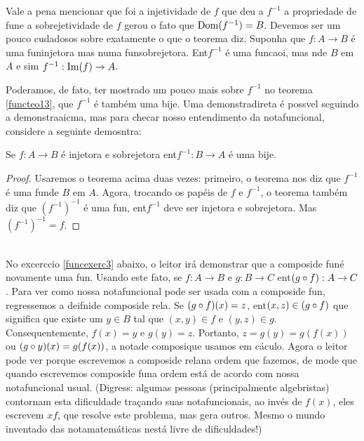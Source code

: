 Vale a pena mencionar que foi a injetividade de $f$ que deu a $f^{-1}$ a propriedade de fun\cao e a sobrejetividade de $f$ gerou o fato que $\operatorname{Dom}(f^{-1})=B$. Devemos ser um pouco cudadosos sobre exatamente o que o teorema diz. Suponha que $f:A\to B$ \'e uma fun\cao injetora mas n\ao uma fun\cao sobrejetora. Ent\ao $f^{-1}$ \'e uma funcaoi, mas n\ao de $B$ em $A$ e sim $f^{-1}:\operatorname{Im}(f)\to A$.

Poder\ih amos, de fato, ter mostrado um pouco mais sobre $f^{-1}$ no teorema \ref{functeo13}, que $f^{-1}$ \'e tamb\'em uma bije\caoi. Uma demonstra\cao direta \'e poss\ih vel seguindo a demonstra\cao aicma, mas para checar nosso entendimento da nota\cao funcional, considere a seguinte demosntra\caoi:
\begin{teob}\label{functeo14}
Se $f:A\to B$ \'e injetora e sobrejetora ent\ao $f^{-1}:B\to A$ \'e uma bije\caoi.
\end{teob}
\begin{proof}
Usaremos o teorema acima duas vezes: primeiro, o teorema nos diz que $f^{-1}$ \'e uma fun\cao de $B$ em $A$. Agora, trocando os pap\'eis de $f$ e $f^{-1}$, o teorema tamb\'em diz que $(f^{-1})^{-1}$ \'e uma fun\caoi, ent\ao $f^{-1}$ deve ser injetora e sobrejetora. Mas $(f^{-1})^{-1}=f$.
\end{proof}
\\

No excerc\ih cio \ref{funcexerc3} abaixo, o leitor ir\'a demonstrar que a composi\cao de fun\coes \'e novamente uma fun\caoi. Usando este fato, se $f:A\to B$ e $g:B\to C$ ent\ao $(g\circ f):A\to C$. Para ver como nossa nota\cao funcional pode ser usada com a composi\cao de fun\cois, regressemos a deifni\cao de composi\cao de rela\cois. Se $(g\circ f)(x)=z$, ent\ao $(x,z)\in (g\circ f)$ que significa que existe um $y\in B$ tal que $(x,y)\in f$ e $(y,z)\in g$. Consequentemente, $f(x)=y$ e $g(y)=z$. Portanto, $z=g(y)=g(f(x))$ ou $(g\circ y)(x)=g(f(x))$, a nota\cao de composi\cao que usamos em c\'aculo. Agora o leitor pode ver porque escrevemos a composi\cao de rela\coes na ordem que fazemos, de mode que quando escrevemos composi\cao de fun\coes a ordem est\'a de acordo com nossa nota\cao funcional usual. (Digress\aoi: algumas pessoas (principalmente algebristas) contornam esta dificuldade traçando suas nota\coes funcionais, ao inv\'es de $f(x)$, eles escrevem $xf$, que resolve este problema, mas gera outros. Mesmo o mundo inventado das nota\coes matem\'aticas n\ao est\'a livre de dificuldades!)

